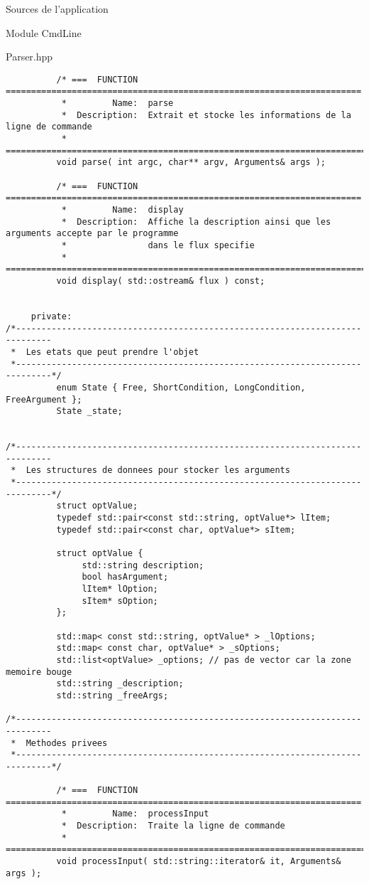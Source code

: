 \documentclass{article}
\begin{document}
\begin{section}{Sources de l'application}
\begin{subsection}{Module CmdLine}
\begin{paragraph}{Parser.hpp}
\begin{verbatim}
          /* ===  FUNCTION  ======================================================================
           *         Name:  parse
           *  Description:  Extrait et stocke les informations de la ligne de commande
           * =====================================================================================*/
          void parse( int argc, char** argv, Arguments& args );

          /* ===  FUNCTION  ======================================================================
           *         Name:  display
           *  Description:  Affiche la description ainsi que les arguments accepte par le programme
           *                dans le flux specifie
           * =====================================================================================*/
          void display( std::ostream& flux ) const;


     private:
/*-----------------------------------------------------------------------------
 *  Les etats que peut prendre l'objet
 *-----------------------------------------------------------------------------*/
          enum State { Free, ShortCondition, LongCondition, FreeArgument };
          State _state;

          
/*-----------------------------------------------------------------------------
 *  Les structures de donnees pour stocker les arguments
 *-----------------------------------------------------------------------------*/
          struct optValue;
          typedef std::pair<const std::string, optValue*> lItem;
          typedef std::pair<const char, optValue*> sItem;

          struct optValue {
               std::string description;
               bool hasArgument;
               lItem* lOption;
               sItem* sOption;
          };

          std::map< const std::string, optValue* > _lOptions;
          std::map< const char, optValue* > _sOptions;
          std::list<optValue> _options; // pas de vector car la zone memoire bouge
          std::string _description;
          std::string _freeArgs;

/*-----------------------------------------------------------------------------
 *  Methodes privees
 *-----------------------------------------------------------------------------*/

          /* ===  FUNCTION  ======================================================================
           *         Name:  processInput
           *  Description:  Traite la ligne de commande
           * =====================================================================================*/
          void processInput( std::string::iterator& it, Arguments& args );


\end{verbatim}
\end{paragraph}
\end{subsection}
\end{section}
\end{document}
